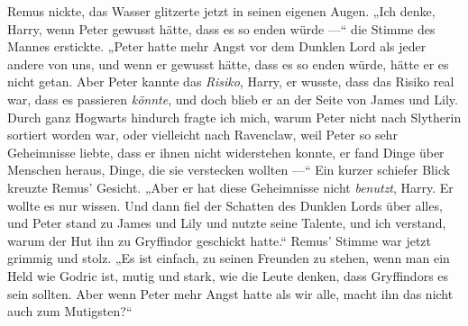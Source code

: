 Remus nickte, das Wasser glitzerte jetzt in seinen eigenen Augen.
„Ich denke, Harry, wenn Peter gewusst hätte, dass es so enden würde —“ die Stimme des Mannes erstickte.
„Peter hatte mehr Angst vor dem Dunklen Lord als jeder andere von uns, und wenn er gewusst hätte, dass es so enden würde, hätte er es nicht getan. Aber Peter kannte das \emph{Risiko}, Harry, er wusste, dass das Risiko real war, dass es passieren \emph{könnte}, und doch blieb er an der Seite von James und Lily. Durch ganz Hogwarts hindurch fragte ich mich, warum Peter nicht nach Slytherin sortiert worden war, oder vielleicht nach Ravenclaw, weil Peter so sehr Geheimnisse liebte, dass er ihnen nicht widerstehen konnte, er fand Dinge über Menschen heraus, Dinge, die sie verstecken wollten —“ Ein kurzer schiefer Blick kreuzte Remus’ Gesicht.
„Aber er hat diese Geheimnisse nicht \emph{benutzt}, Harry. Er wollte es nur wissen. Und dann fiel der Schatten des Dunklen Lords über alles, und Peter stand zu James und Lily und nutzte seine Talente, und ich verstand, warum der Hut ihn zu Gryffindor geschickt hatte.“ Remus’ Stimme war jetzt grimmig und stolz.
„Es ist einfach, zu seinen Freunden zu stehen, wenn man ein Held wie Godric ist, mutig und stark, wie die Leute denken, dass Gryffindors es sein sollten. Aber wenn Peter mehr Angst hatte als wir alle, macht ihn das nicht auch zum Mutigsten?“

